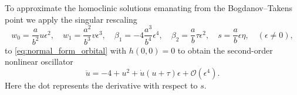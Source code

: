 To approximate the homoclinic solutions emanating from the Bogdanov--Takens point
we apply the singular rescaling
\begin{equation}
\label{eq:blowup}				
w_0 = \frac a{b^2} u \epsilon^2, \quad
w_1 = \frac{a^2}{b^3} v \epsilon^3, \quad
\beta_1 = -4 \frac{a^3}{b^4} \epsilon^4, \quad 
\beta_2 = \frac a b \tau \epsilon^2, \quad 
s = \frac ab \epsilon \eta, \quad (\epsilon \neq 0),
\end{equation}
to \cref{eq:normal_form_orbital} with $h(0,0)=0$ to obtain the second-order
nonlinear oscillator
\begin{equation}
\label{eq:second_order_nonlinear_oscillator}
				\ddot u = -4 + u^2 + \dot u \left( u + \tau \right)\epsilon + \mathcal
								O(\epsilon^4).
\end{equation}
Here the dot represents the derivative with respect to $s$.

